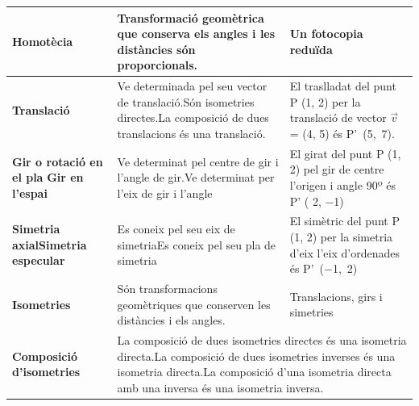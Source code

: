 \newpage
\resum
\begin{center}
	\renewcommand{\arraystretch}{1.8}
\begin{longtable}{|p{}|p{}|p{}|} \hline 
	
\cellcolor{lightgray} \textbf{Homotècia} & Transformació geomètrica  que conserva els angles i les distàncies són proporcionals. & Un fotocopia reduïda \\ \hline 

\cellcolor{lightgray} \textbf{Translació} & Ve determinada pel seu vector de translació.\newline Són isometries directes.\newline La composició de dues translacions és una translació. & El traslladat del punt P (1, 2) per la translació de vector $\vec v$ = (4, 5) és P'~(5,~7). \\ \hline 

\cellcolor{lightgray} \textbf{Gir o rotació en el pla}\newline\textbf{ Gir en l'espai} & Ve determinat pel centre de gir i l'angle de gir.\newline Ve determinat per l'eix de gir i l'angle & El girat del punt P (1, 2) pel gir de centre l'origen i angle 90º és \newline P' ( 2, $-$1) \\ \hline 

\cellcolor{lightgray} \textbf{Simetria axial}\newline \textbf{Simetria especular} & Es coneix pel seu eix de simetria\newline Es coneix pel seu pla de simetria & El simètric del punt P (1, 2) per la simetria d'eix l'eix d'ordenades és P'~($-$1,~2) \\ \hline 

\cellcolor{lightgray} \textbf{ Isometries} & Són transformacions geomètriques que conserven les distàncies i els angles. & Translacions, girs i simetries \\ \hline 

\cellcolor{lightgray} \textbf{Composició d'isometries}  & \multicolumn{2}{|p{0.74\textwidth}|}{La composició de dues isometries directes és una isometria directa.\newline La composició de dues isometries inverses és una isometria directa.\newline La composició d'una isometria directa amb una inversa és una isometria inversa.} \\ \hline 


\end{longtable}
\end{center}
